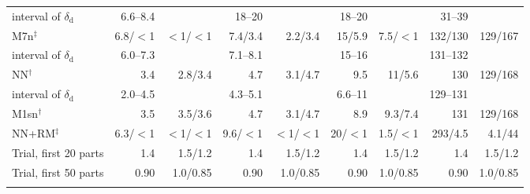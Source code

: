 \documentclass[pdflatex,sn-basic,lineno]{sn-jnl}
\begin{document}
\begin{table}[t]
\begin{tabular}{@{}lrrrrrrrr@{}}
\quad interval of $\delta_\mathrm{d}$ & 6.6--8.4 &  & 18--20 &  & 18--20 &  & 31--39 & \\
M7n$^\ddagger$ & 6.8/$<$1 & $<$1/$<$1 & 7.4/3.4 & 2.2/3.4 & 15/5.9 & 7.5/$<$1 & 132/130 & 129/167 \\
\quad interval of $\delta_\mathrm{d}$ & 6.0--7.3 &  & 7.1--8.1 &  & 15--16 &  & 131--132 & \\
NN$^\dagger$ & 3.4 & 2.8/3.4 & 4.7 & 3.1/4.7 & 9.5 & 11/5.6 & 130 & 129/168 \\
\quad interval of $\delta_\mathrm{d}$ & 2.0--4.5 &  & 4.3--5.1 &  & 6.6--11 &  & 129--131 & \\
M1sn$^\dagger$ & 3.5 & 3.5/3.6 & 4.7 & 3.1/4.7 & 8.9 & 9.3/7.4 & 131 & 129/168 \\
NN+RM$^\ddagger$ & 6.3/$<$1 & $<$1/$<$1 & 9.6/$<$1 & $<$1/$<$1 & 20/$<$1 & 1.5/$<$1 & 293/4.5 & 4.1/44 \\
\midrule Trial, first 20 parts & 1.4 & 1.5/1.2 & 1.4 & 1.5/1.2 & 1.4 & 1.5/1.2 & 1.4 & 1.5/1.2 \\
Trial, first 50 parts & 0.90 & 1.0/0.85 & 0.90 & 1.0/0.85 & 0.90 & 1.0/0.85 & 0.90 & 1.0/0.85 \\
\botrule
\end{tabular}

\end{table}
\end{document}
